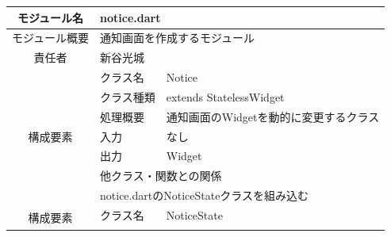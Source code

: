 \begin{table}[H]
  \centering
  \begin{tabular}{|c|l|l|} \hline
    モジュール名                & \multicolumn{2}{l|}{notice.dart}                                                                                                               \\ \hline
    モジュール概要               & \multicolumn{2}{p{12cm}|}{通知画面を作成するモジュール}                                                                                                      \\ \hline
    責任者                   & \multicolumn{2}{l|}{新谷光城}                                                                                                                      \\ \hline
    \multirow{7}{*}{構成要素} & クラス名                                                       & Notice                                                                            \\ \cline{2-3}
                          & クラス種類                                                      & extends StatelessWidget                                                           \\ \cline{2-3}
                          & 処理概要                                                       & \multicolumn{1}{p{12cm}|}{通知画面のWidgetを動的に変更するクラス}                                 \\ \cline{2-3}
                          & 入力                                                         & なし                                                                                \\ \cline{2-3}
                          & 出力                                                         & Widget                                                                            \\ \cline{2-3}
                          & \multicolumn{2}{l|}{他クラス・関数との関係}                                                                                                               \\ \cline{2-3}
                          & \multicolumn{2}{p{14cm}|}{notice.dartのNoticeStateクラスを組み込む}                                                                                     \\ \hline
    \multirow{7}{*}{構成要素} & クラス名                                                       & NoticeState                                                                       \\ \cline{2-3}

\end{tabular}
\end{table}
